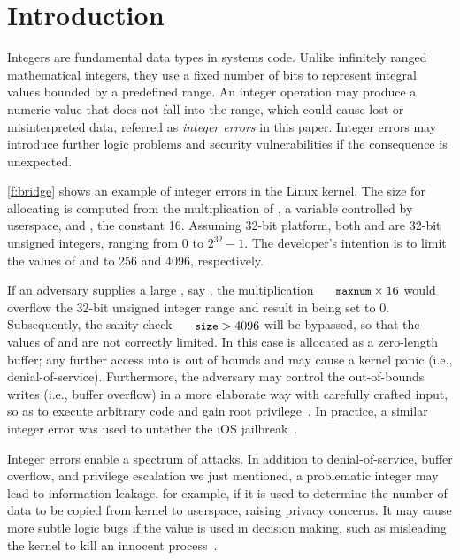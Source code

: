 \section{Introduction}
\label{s:intro}

Integers are fundamental data types in systems code.  Unlike
infinitely ranged mathematical integers, they use a fixed number
of bits to represent integral values bounded by a predefined range.
An integer operation may produce a numeric value that does not fall
into the range, which could cause lost or misinterpreted data, referred
as \emph{integer errors} in this paper.  Integer errors may introduce
further logic problems and security vulnerabilities if the consequence
is unexpected.

\autoref{f:bridge} shows an example of integer errors in the Linux
kernel.  The size for allocating  is computed from the
multiplication of , a variable controlled by userspace,
and , the constant 16.  Assuming
32-bit platform, both  and  are 32-bit unsigned
integers, ranging from 0 to $2^{32} - 1$.
The developer's intention is to limit the values of 
 and  to 256 and 4096, respectively.

If an adversary supplies a large , say ,
the multiplication $\cc{maxnum} \times 16$ would overflow the 32-bit
unsigned integer range and result in  being set to 0.
Subsequently, the sanity check $\cc{size} > 4096$ will be bypassed,
so that the values of  and  are not correctly
limited.  In this case  is allocated as a zero-length buffer;
any further access into  is out of bounds and may cause a
kernel panic (i.e., denial-of-service).  Furthermore, the adversary
may control the out-of-bounds writes (i.e., buffer overflow) in a
more elaborate way with carefully crafted input, so as to execute
arbitrary code and gain root privilege~\cite[CVE-2006-5751]{cve}.
In practice, a similar integer error was used to untether the iOS
jailbreak~\cite{esser:ios}.

Integer errors enable a spectrum of attacks.  In addition to
denial-of-service, buffer overflow, and privilege escalation we
just mentioned, a problematic integer may lead to information
leakage, for example, if it is used to determine the number of data
to be copied from kernel to userspace, raising privacy concerns.
It may cause more subtle logic bugs if the value is used in decision
making, such as misleading the kernel to kill an innocent
process~\cite[CVE-2011-4097]{cve}.

